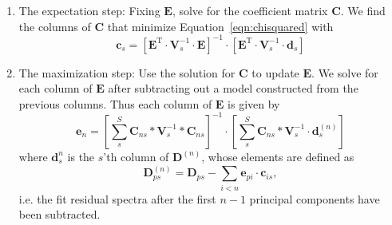 \documentclass[a4paper,fleqn,usenatbib]{mnras}
\begin{document}
\begin{enumerate}
\item The expectation step: Fixing $\mathbf{E}$, solve for the coefficient matrix $\mathbf{C}$. We find the columns of $\mathbf{C}$ that minimize Equation~\eqref{eqn:chisquared} with
\begin{equation}
	\mathbf{c}_s = \left[\mathbf{E}^{\mathrm{T}}\cdot\mathbf{V}_{s}^{-1}\cdot \mathbf{E}\right]^{-1}\cdot\left[\mathbf{E}^{\mathrm{T}}\cdot\mathbf{V}_{s}^{-1}\cdot\mathbf{d}_s\right]
\end{equation}
%

\item The maximization step: Use the solution for $\mathbf{C}$ to update $\mathbf{E}$. We solve for each column of $\mathbf{E}$ after subtracting out a model constructed from the previous columns. Thus each column of $\mathbf{E}$ is given by
\begin{equation}
	\mathbf{e}_n = \left[\sum_s^S \mathbf{C}_{ns} * \mathbf{V}_{s}^{-1} * \mathbf{C}_{ns}\right]^{-1}\cdot\left[\sum_s^S \mathbf{C}_{ns} * \mathbf{V}_{s}^{-1} \cdot \mathbf{d}^{(n)}_s\right]
\end{equation}
%
where $\mathbf{d}^{n}_s$ is the $s$'th column of $\mathbf{D}^{(n)}$, whose elements are defined as
\begin{equation}
\mathbf{D}^{(n)}_{ps} = \mathbf{D}_{ps} - \sum_{i<n}\mathbf{e}_{pi}\cdot\mathbf{c}_{is},
\label{eqn:deltaj}
\end{equation}
i.e. the fit residual spectra after the first $n-1$ principal components have been subtracted. %
\end{enumerate}
\end{document}
